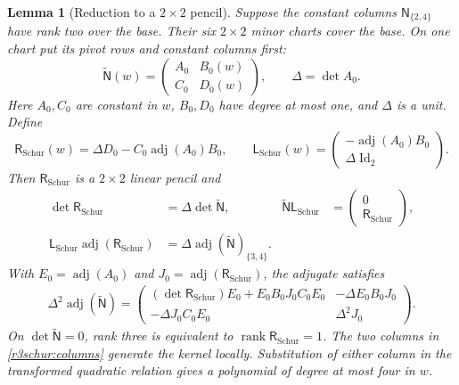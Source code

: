 \documentclass[11pt,a4paper]{article}
\numberwithin{equation}{section}
\theoremstyle{plain}
\newtheorem{lemma}[theorem]{Lemma}
\theoremstyle{definition}
\theoremstyle{remark}
\begin{document}
\begin{lemma}[Reduction to a $2\times2$ pencil]
\label{r3schur:reduction}
Suppose the constant columns $\mathsf N_{\{2,4\}}$ have rank two over the base.
Their six $2\times2$ minor charts cover the base.
On one chart put its pivot rows and constant columns first:
\[
 \widetilde{\mathsf N}(w)=\begin{pmatrix}A_0&B_0(w)\\C_0&D_0(w)\end{pmatrix},
 \qquad \Delta=\det A_0.
\]
Here $A_0,C_0$ are constant in $w$, $B_0,D_0$ have degree at most one,
and $\Delta$ is a unit. Define
\[
 \mathsf R_{\mathrm{Schur}}(w)=\Delta D_0-C_0\operatorname{adj}(A_0)B_0,
 \qquad
 \mathsf L_{\mathrm{Schur}}(w)=\begin{pmatrix}-\operatorname{adj}(A_0)B_0\\
                                    \Delta\operatorname{Id}_2\end{pmatrix}.
\]
Then $\mathsf R_{\mathrm{Schur}}$ is a $2\times2$ linear pencil and
\begin{align}
 \det\mathsf R_{\mathrm{Schur}}&=\Delta\det\widetilde{\mathsf N},
 &\widetilde{\mathsf N}\mathsf L_{\mathrm{Schur}}&=\begin{pmatrix}0\\\mathsf R_{\mathrm{Schur}}\end{pmatrix},
 \label{r3schur:basic}\\
 \mathsf L_{\mathrm{Schur}}\operatorname{adj}(\mathsf R_{\mathrm{Schur}})
 &=\Delta\operatorname{adj}(\widetilde{\mathsf N})_{\{3,4\}}.
 \label{r3schur:columns}
\end{align}
With $E_0=\operatorname{adj}(A_0)$ and
$J_0=\operatorname{adj}(\mathsf R_{\mathrm{Schur}})$, the adjugate satisfies
\begin{align}
 \Delta^2\operatorname{adj}(\widetilde{\mathsf N})
 =\begin{pmatrix}
 (\det\mathsf R_{\mathrm{Schur}})E_0+E_0B_0J_0C_0E_0&-\Delta E_0B_0J_0\\
 -\Delta J_0C_0E_0&\Delta^2J_0
 \end{pmatrix}.
 \label{r3schur:fulladj}
\end{align}
On $\det\widetilde{\mathsf N}=0$, rank three is equivalent to
$\operatorname{rank}\mathsf R_{\mathrm{Schur}}=1$.
The two columns in \eqref{r3schur:columns} generate the kernel locally.
Substitution of either column in the transformed quadratic relation
gives a polynomial of degree at most four in $w$.
\end{lemma}
\end{document}
